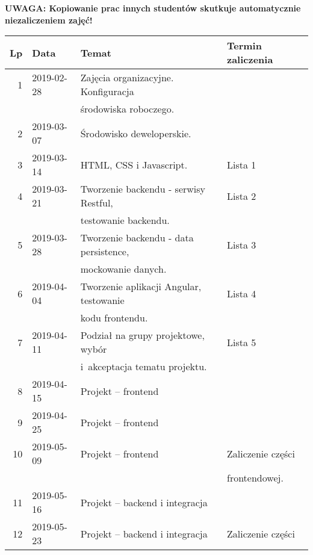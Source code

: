 \documentclass[12pt]{article}
\begin{document}
    \noindent\textbf{UWAGA: Kopiowanie prac innych studentów skutkuje automatycznie niezaliczeniem zajęć!}

    \begin{table}
        \centering
        \begin{tabular}{|r|l|l|l|}
            \hline
            \textbf{Lp}&\textbf{Data} &\textbf{Temat} &\textbf{Termin zaliczenia}\\
            \hline
            1   & 2019-02-28& Zajęcia organizacyjne. Konfiguracja       &\\
                &           & środowiska roboczego.                     &\\
            2   & 2019-03-07& Środowisko deweloperskie.                 &\\
            3   & 2019-03-14& HTML, CSS i Javascript.                   & Lista 1\\
            4   & 2019-03-21& Tworzenie backendu - serwisy Restful,     & Lista 2\\
                &           & testowanie backendu.                      &\\
            5   & 2019-03-28& Tworzenie backendu - data persistence,    & Lista 3\\
                &           & mockowanie danych.                        &\\
            6   & 2019-04-04& Tworzenie aplikacji Angular, testowanie   & Lista 4\\
                &           & kodu frontendu.                           &\\
            7   & 2019-04-11& Podział na grupy projektowe, wybór        & Lista 5\\
                &           & i~akceptacja tematu projektu.             &\\
            8   & 2019-04-15& Projekt -- frontend                       &\\
            9   & 2019-04-25& Projekt -- frontend                       &\\
            10  & 2019-05-09& Projekt -- frontend                       & Zaliczenie części \\
                &           &                                           & frontendowej.\\
            11  & 2019-05-16& Projekt -- backend i integracja           &\\
            12  & 2019-05-23& Projekt -- backend i integracja           & Zaliczenie części\\

\end{tabular}
\end{table}
\end{document}
